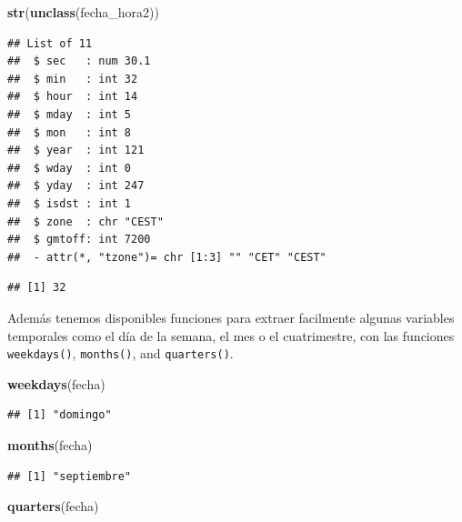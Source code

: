 \documentclass[11pt,]{book}
\newenvironment{Shaded}{\begin{snugshade}}{\end{snugshade}}
\newcommand{\CommentTok}[1]{\textcolor[rgb]{0.37,0.37,0.37}{\textit{#1}}}
\newcommand{\KeywordTok}[1]{\textcolor[rgb]{0.27,0.27,0.27}{\textbf{#1}}}
\newcommand{\NormalTok}[1]{#1}
\newcommand{\OperatorTok}[1]{\textcolor[rgb]{0.43,0.43,0.43}{\textbf{#1}}}
\begin{document}
\begin{Shaded}
\begin{Highlighting}[]
\KeywordTok{str}\NormalTok{(}\KeywordTok{unclass}\NormalTok{(fecha_hora2))}
\end{Highlighting}
\end{Shaded}

\begin{verbatim}
## List of 11
##  $ sec   : num 30.1
##  $ min   : int 32
##  $ hour  : int 14
##  $ mday  : int 5
##  $ mon   : int 8
##  $ year  : int 121
##  $ wday  : int 0
##  $ yday  : int 247
##  $ isdst : int 1
##  $ zone  : chr "CEST"
##  $ gmtoff: int 7200
##  - attr(*, "tzone")= chr [1:3] "" "CET" "CEST"
\end{verbatim}

\begin{Shaded}
\end{Shaded}

\begin{verbatim}
## [1] 32
\end{verbatim}

Además tenemos disponibles funciones para extraer facilmente algunas variables temporales como el día de la semana, el mes o el cuatrimestre, con las funciones \texttt{weekdays()}, \texttt{months()}, and \texttt{quarters()}.

\begin{Shaded}
\begin{Highlighting}[]
\KeywordTok{weekdays}\NormalTok{(fecha)}
\end{Highlighting}
\end{Shaded}

\begin{verbatim}
## [1] "domingo"
\end{verbatim}

\begin{Shaded}
\begin{Highlighting}[]
\KeywordTok{months}\NormalTok{(fecha)}
\end{Highlighting}
\end{Shaded}

\begin{verbatim}
## [1] "septiembre"
\end{verbatim}

\begin{Shaded}
\begin{Highlighting}[]
\KeywordTok{quarters}\NormalTok{(fecha)}
\end{Highlighting}
\end{Shaded}
\end{document}
